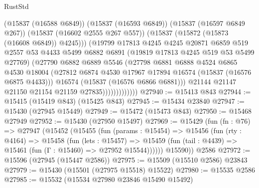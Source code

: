 \begin{lexlean}{RustStd}
\begin{coremodule}
{\begin{coremodule}
{{{{{{{{{{{{{{{{{{{{{{{{{{{{{{{{{{{{{{{{{{{{{{{{{{{{{{{{{{{{                            (@15837 (@16588 @6849))
                            (@15837 (@16593 @6849))
                            (@15837 (@16597 @6849 @267))
                            (@15837 (@16602 @2555 @267 @557))
                            (@15837 (@15872 (@15873 (@16608 @6849)) @4245)))
                          (@19799
                            @17813
                            @4245
                            @4245
                            @20871
                            @6859
                            @519
                            @2557
                            @53
                            @4433
                            @5499
                            @6882
                            @6891
                            (@19819 @17813 @4245 @519 @53 @5499 @27769)
                            (@27790
                              @6882
                              @6889
                              @5546
                              (@27798
                                @6881
                                @6888
                                @4524
                                @6865
                                @4530
                                @18004
                                (@27812
                                  @6874
                                  @4530
                                  @17967
                                  @17894
                                  @16574
                                  (@15837 (@16576 @6875 @4433)))
                                @16574
                                (@15837 (@16576 @6866 @6881)))
                              @21144
                              @21147
                              @21150
                              @21154
                              @21159
                              @27835)))))))))))))
@27940 := @15413 @843
@27944 := @15415 (@15419 @843) (@15425 @843)
@27945 := @15434 @23840
@27947 := @15430 (@27945 @15449)
@27949 := @15472 (@15473 @843)
@27950 := @15468 @27949
@27952 := @15430 (@27950 @15497)
@27969 := @15429
    (fun (fn : @76) =>
    @27947
      (@15452
        (@15455
          (fun (params : @15454) =>
          @15456
            (fun (rty : @4164) =>
            @15458
              (fun (lets : @15457) =>
              @15459 (fun (tail : @4439) => @15461 (fun (Γ : @15460) => @27952 @15544))))))
        @15590))
    @2586
@27972 := @15596 (@27945 (@15447 @2586))
@27975 := @15509 (@15510 @2586) @23843
@27979 := @15430 (@15501 (@27975 @15518) @15522)
@27980 := @15535 @2586
@27985 := @15532 (@15534 @27980 @23846 @15490 @15492)
}}}}}}}}}}}}}}}}}}}}}}}}}}}}}}}}}}}}}}}}}}}}}}}}}}}}}}}}}}}}
\end{coremodule}}
\end{coremodule}
\end{lexlean}
